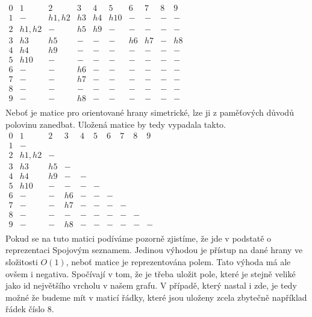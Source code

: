 $\begin{matrix}
 0 & 1 & 2 & 3 & 4 & 5 & 6 & 7 & 8 & 9 \\
 1 & - & h1,h2 & h3 & h4 & h10 & - & - & - & - \\
 2 & h1,h2 & - & h5 & h9 & - & - & - & - & - \\
 3 & h3 & h5  & - & - & - & h6 & h7 & - & h8 \\
 4 & h4 & h9 & - & - & - & - & - & - & - \\
 5 & h10 & - & - & - & - & - & - & - & - \\
 6 & - & - & h6 & - & - & - & - & - & - \\
 7 & - & - & h7 & - & - & - & - & - & - \\
 8 & - & - & - & - & - & - & - & - & - \\
 9 & - & - & h8 & - & - & - & - & - & - \\
\end{matrix}$\\

Neboť je matice pro orientované hrany simetrické, lze ji z paměťových důvodů polovinu zanedbat.
Uložená matice by tedy vypadala takto.\\

$\begin{matrix}
0 & 1 & 2 & 3 & 4 & 5 & 6 & 7 & 8 & 9 \\
1 & -  \\
2 & h1,h2 & -  \\
3 & h3 & h5  & -  \\
4 & h4 & h9 & - & -  \\
5 & h10 & - & - & - & -  \\
6 & - & - & h6 & - & - & - \\
7 & - & - & h7 & - & - & - & - \\
8 & - & - & - & - & - & - & - & -  \\
9 & - & - & h8 & - & - & - & - & - & - \\
\end{matrix}$\\

Pokud se na tuto matici podíváme pozorně zjistíme, že jde v podstatě o reprezentaci Spojovým seznamem. Jedinou výhodou je přístup na dané hrany ve složitosti $O(1)$, neboť matice je reprezentována polem. Tato výhoda má ale ovšem i negativa. Spočívají v tom, že je třeba uložit pole, které je stejně veliké jako id největšího vrcholu v našem grafu. V případě, který nastal i zde, je tedy možné že budeme mít v maticí řádky, které jsou uloženy zcela zbytečně například řádek číslo 8.\\

